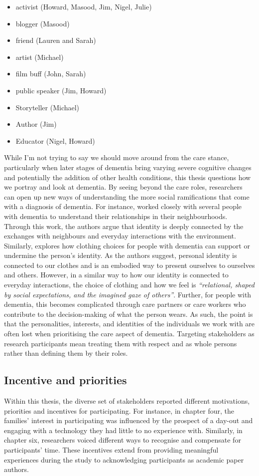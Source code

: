 \begin{itemize}
\item	activist (Howard, Masood, Jim, Nigel, Julie)
\item	blogger (Masood)
\item	friend (Lauren and Sarah)
\item	artist (Michael)
\item	film buff (John, Sarah)
\item	public speaker (Jim, Howard)
\item	Storyteller (Michael)
\item	Author (Jim)
\item	Educator (Nigel, Howard)
\end{itemize}

While I'm not trying to say we should move around from the care stance, particularly when later stages of dementia bring varying severe cognitive changes and potentially the addition of other health conditions, this thesis questions how we portray and look at dementia. By seeing beyond the care roles, researchers can open up new ways of understanding the more social ramifications that come with a diagnosis of dementia. For instance, \cite{kullberg2017walking} worked closely with several people with dementia to understand their relationships in their neighbourhoods. Through this work, the authors argue that identity is deeply connected by the exchanges with neighbours and everyday interactions with the environment. Similarly, \cite{twigg_dress_2013} explores how clothing choices for people with dementia can support or undermine the person's identity. As the authors suggest, personal identity is connected to our clothes and is an embodied way to present ourselves to ourselves and others. However, in a similar way to how our identity is connected to everyday interactions, the choice of clothing and how we feel is \textit{``relational, shaped by social expectations, and the imagined gaze of others''}. Further, for people with dementia, this becomes complicated through care partners or care workers who contribute to the decision-making of what the person wears. As such, the point is that the personalities, interests, and identities of the individuals we work with are often lost when prioritising the care aspect of dementia. Targeting stakeholders as research participants mean treating them with respect and as whole persons rather than defining them by their roles.

\subsection{Incentive and priorities }
\label{incentive}
Within this thesis, the diverse set of stakeholders reported different motivations, priorities and incentives for participating. For instance, in chapter four, the families' interest in participating was influenced by the prospect of a day-out and engaging with a technology they had little to no experience with. Similarly, in chapter six, researchers voiced different ways to recognise and compensate for participants' time. These incentives extend from providing meaningful experiences during the study to acknowledging participants as academic paper authors. 

